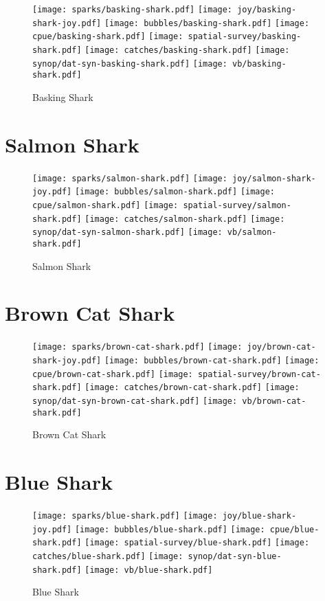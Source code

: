 \begin{figure}[htbp]
\centering
\texttt{[image: sparks/basking-shark.pdf]}
\texttt{[image: joy/basking-shark-joy.pdf]}
\texttt{[image: bubbles/basking-shark.pdf]}
\texttt{[image: cpue/basking-shark.pdf]}
\texttt{[image: spatial-survey/basking-shark.pdf]}
\texttt{[image: catches/basking-shark.pdf]}
\texttt{[image: synop/dat-syn-basking-shark.pdf]}
\texttt{[image: vb/basking-shark.pdf]}
\caption{Basking Shark}
\end{figure}
\clearpage
\section{Salmon Shark}

\begin{figure}[htbp]
\centering
\texttt{[image: sparks/salmon-shark.pdf]}
\texttt{[image: joy/salmon-shark-joy.pdf]}
\texttt{[image: bubbles/salmon-shark.pdf]}
\texttt{[image: cpue/salmon-shark.pdf]}
\texttt{[image: spatial-survey/salmon-shark.pdf]}
\texttt{[image: catches/salmon-shark.pdf]}
\texttt{[image: synop/dat-syn-salmon-shark.pdf]}
\texttt{[image: vb/salmon-shark.pdf]}
\caption{Salmon Shark}
\end{figure}
\clearpage
\section{Brown Cat Shark}

\begin{figure}[htbp]
\centering
\texttt{[image: sparks/brown-cat-shark.pdf]}
\texttt{[image: joy/brown-cat-shark-joy.pdf]}
\texttt{[image: bubbles/brown-cat-shark.pdf]}
\texttt{[image: cpue/brown-cat-shark.pdf]}
\texttt{[image: spatial-survey/brown-cat-shark.pdf]}
\texttt{[image: catches/brown-cat-shark.pdf]}
\texttt{[image: synop/dat-syn-brown-cat-shark.pdf]}
\texttt{[image: vb/brown-cat-shark.pdf]}
\caption{Brown Cat Shark}
\end{figure}
\clearpage
\section{Blue Shark}

\begin{figure}[htbp]
\centering
\texttt{[image: sparks/blue-shark.pdf]}
\texttt{[image: joy/blue-shark-joy.pdf]}
\texttt{[image: bubbles/blue-shark.pdf]}
\texttt{[image: cpue/blue-shark.pdf]}
\texttt{[image: spatial-survey/blue-shark.pdf]}
\texttt{[image: catches/blue-shark.pdf]}
\texttt{[image: synop/dat-syn-blue-shark.pdf]}
\texttt{[image: vb/blue-shark.pdf]}
\caption{Blue Shark}
\end{figure}
\clearpage
